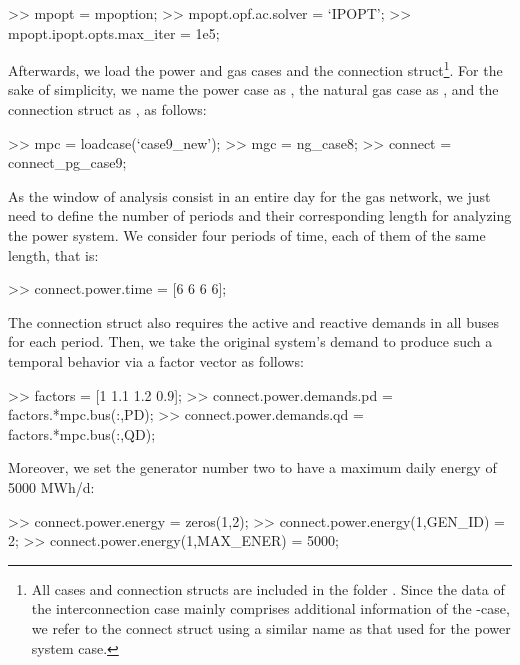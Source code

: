 \begin{Code}
>> mpopt = mpoption;                   %
>> mpopt.opf.ac.solver = `IPOPT';      %
>> mpopt.ipopt.opts.max_iter = 1e5;    %
\end{Code}

Afterwards, we load the power and gas cases and the connection struct\footnote{All cases and connection structs are included in the folder \mpngcasepath{}. Since the data of the interconnection case mainly comprises additional information of the \matpower{}-case, we refer to the connect struct using a similar name as that used for the power system case.}. For the sake of simplicity, we name the power case as , the natural gas case as ,  and the connection struct as , as follows: 

\begin{Code}
>> mpc = loadcase(`case9_new');    %
>> mgc = ng_case8;                 %
>> connect = connect_pg_case9;     %
\end{Code}

As the window of analysis consist in an entire day for the gas network, we just need to define the number of periods and their corresponding length for analyzing the power system. We consider four periods of time, each of them of the same length, that is:

\begin{Code}
>> connect.power.time = [6 6 6 6];   %
\end{Code}

The connection struct also requires the active and reactive demands in all buses for each period. Then, we take the original system's demand to produce such a temporal behavior via a factor vector as follows:  

\begin{Code}
>> factors = [1 1.1 1.2 0.9];      %
>> connect.power.demands.pd = factors.*mpc.bus(:,PD);  %
>> connect.power.demands.qd = factors.*mpc.bus(:,QD);  %
\end{Code}

Moreover, we set the generator number two to have a maximum daily energy of 5000 MWh/d:

\begin{Code}
>> connect.power.energy = zeros(1,2);  %
>> connect.power.energy(1,GEN_ID) = 2;         %
>> connect.power.energy(1,MAX_ENER) = 5000;    %
\end{Code}

